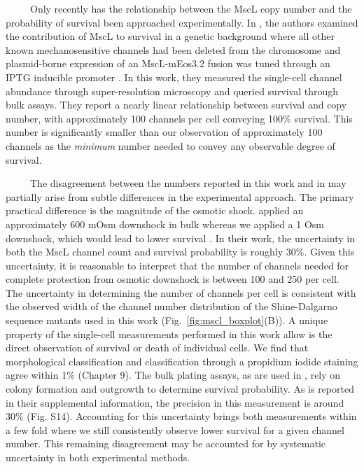 \documentclass[12pt]{caltech_thesis}
\begin{document}
~~~~~Only recently has the relationship between the MscL copy number and
the probability of survival been approached experimentally. In
\textcite{vandenberg2016}, the authors examined the contribution of MscL
to survival in a genetic background where all other known
mechanosensitive channels had been deleted from the chromosome and
plasmid-borne expression of an MscL-mEos3.2 fusion was tuned through an
IPTG inducible promoter \autocite{vandenberg2016}. In this work, they
measured the single-cell channel abundance through super-resolution
microscopy and queried survival through bulk assays. They report a
nearly linear relationship between survival and copy number, with
approximately 100 channels per cell conveying 100\% survival. This
number is significantly smaller than our observation of approximately
100 channels as the \emph{minimum} number needed to convey any
observable degree of survival.

~~~~~The disagreement between the numbers reported in this work and in
\textcite{vandenberg2016} may partially arise from subtle differences in
the experimental approach. The primary practical difference is the
magnitude of the osmotic shock. \autocite{vandenberg2016} applied an
approximately 600 mOsm downshock in bulk whereas we applied a 1 Osm
downshock, which would lead to lower survival \autocite{levina1999}. In
their work, the uncertainty in both the MscL channel count and survival
probability is roughly 30\%. Given this uncertainty, it is reasonable to
interpret that the number of channels needed for complete protection
from osmotic downshock is between 100 and 250 per cell. The uncertainty
in determining the number of channels per cell is consistent with the
observed width of the channel number distribution of the Shine-Dalgarno
sequence mutants used in this work (Fig.~\ref{fig:mscl_boxplot}(B)). A
unique property of the single-cell measurements performed in this work
allow is the direct observation of survival or death of individual
cells. We find that morphological classification and classification
through a propidium iodide staining agree within 1\% (Chapter 9). The
bulk plating assays, as are used in \textcite{vandenberg2016}, rely on
colony formation and outgrowth to determine survival probability. As is
reported in their supplemental information, the precision in this
measurement is around 30\% (Fig. S14). Accounting for this uncertainty
brings both measurements within a few fold where we still consistently
observe lower survival for a given channel number. This remaining
disagreement may be accounted for by systematic uncertainty in both
experimental methods.
\end{document}

